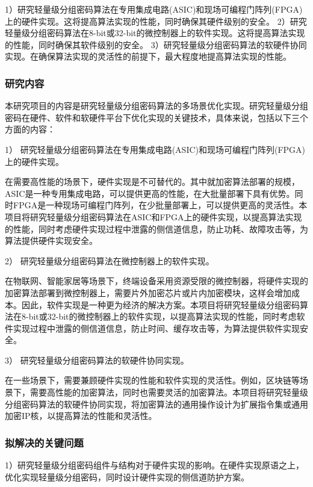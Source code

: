 \documentclass{ctexart}
\begin{document}
1）研究轻量级分组密码算法在专用集成电路(ASIC)和现场可编程门阵列(FPGA)上的硬件实现。这将提高算法实现的性能，同时确保其硬件级别的安全。
2）研究轻量级分组密码算法在8-bit或32-bit的微控制器上的软件实现。这将提高算法实现的性能，同时确保其软件级别的安全。
3）研究轻量级分组密码算法的软硬件协同实现。在确保算法实现的灵活性的前提下，最大程度地提高算法实现的性能。

\subsubsection{研究内容}

本研究项目的内容是研究轻量级分组密码算法的多场景优化实现。研究轻量级分组密码在硬件、软件和软硬件平台下优化实现的关键技术，具体来说，包括以下三个方面的内容：

1）  研究轻量级分组密码算法在专用集成电路(ASIC)和现场可编程门阵列(FPGA)上的硬件实现。

在需要高性能的场景下，硬件实现是不可替代的。其中就加密算法部署的规模，ASIC是一种专用集成电路，可以提供更高的性能，在大批量部署下具有优势。同时FPGA是一种现场可编程门阵列，在少批量部署上，可以提供更高的灵活性。本项目将研究轻量级分组密码算法在ASIC和FPGA上的硬件实现，以提高算法实现的性能，同时考虑硬件实现过程中泄露的侧信道信息，防止功耗、故障攻击等，为算法提供硬件实现安全。

2）  研究轻量级分组密码算法在微控制器上的软件实现。

在物联网、智能家居等场景下，终端设备采用资源受限的微控制器，将硬件实现的加密算法部署到微控制器上，需要片外加密芯片或片内加密模块，这样会增加成本。因此，软件实现是一种更为经济的解决方案。本项目将研究轻量级分组密码算法在8-bit或32-bit的微控制器上的软件实现，以提高算法实现的性能，同时考虑软件实现过程中泄露的侧信道信息，防止时间、缓存攻击等，为算法提供软件实现安全。

3）  研究轻量级分组密码算法的软硬件协同实现。

在一些场景下，需要兼顾硬件实现的性能和软件实现的灵活性。例如，区块链等场景下，需要高性能的加密算法，同时也需要灵活的加密算法。本项目将研究轻量级分组密码算法的软硬件协同实现，将加密算法的通用操作设计为扩展指令集或通用加密IP核，以提高算法的性能和灵活性。


\subsubsection{拟解决的关键问题}

1）研究轻量级分组密码组件与结构对于硬件实现的影响。在硬件实现原语之上，优化实现轻量级分组密码，同时设计硬件实现的侧信道防护方案。
\end{document}
